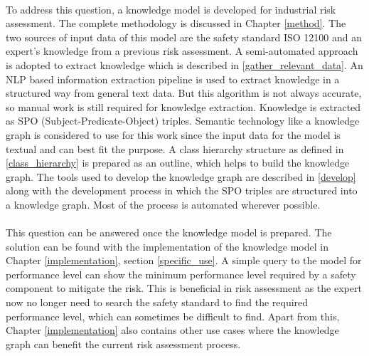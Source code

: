 \paragraph{} To address this question, a knowledge model is developed for industrial risk assessment. The complete methodology is discussed in Chapter \ref{method}. The two sources of input data of this model are the safety standard ISO 12100 and an expert's knowledge from a previous risk assessment. A semi-automated approach is adopted to extract knowledge which is described in \ref{gather_relevant_data}. An NLP based information extraction pipeline is used to extract knowledge in a structured way from general text data. But this algorithm is not always accurate, so manual work is still required for knowledge extraction. Knowledge is extracted as SPO (Subject-Predicate-Object) triples. Semantic technology like a knowledge graph is considered to use for this work since the input data for the model is textual and can best fit the purpose. A class hierarchy structure as defined in \ref{class_hierarchy} is prepared as an outline, which helps to build the knowledge graph. The tools used to develop the knowledge graph are described in \ref{develop} along with the development process in which the SPO triples are structured into a knowledge graph. Most of the process is automated wherever possible. 


\paragraph{} This question can be answered once the knowledge model is prepared. The solution can be found with the implementation of the knowledge model in Chapter \ref{implementation}, section \ref{specific_use}. A simple query to the model for performance level can show the minimum performance level required by a safety component to mitigate the risk. This is beneficial in risk assessment as the expert now no longer need to search the safety standard to find the required performance level, which can sometimes be difficult to find. Apart from this, Chapter \ref{implementation} also contains other use cases where the knowledge graph can benefit the current risk assessment process.


